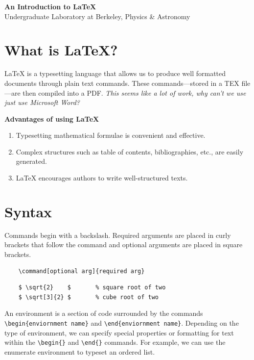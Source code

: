 \documentclass[11pt]{article}
\begin{document}
\begin{center}
    \huge \textbf{An Introduction to \LaTeX}\\{\LARGE Undergraduate Laboratory at Berkeley, Physics \& Astronomy}
\end{center}

\section{What is LaTeX?}

LaTeX is a typesetting language that allows us to produce well formatted documents through plain text commands. These commands---stored in a TEX file---are then compiled into a PDF. \textit{This seems like a lot of work, why can't we use just use Microsoft Word?}

\textbf{Advantages of using LaTeX}
\begin{enumerate}
    \item Typesetting mathematical formulae is convenient and effective.
    \item Complex structures such as table of contents, bibliographies, etc., are easily generated.
    \item LaTeX encourages authors to write well-structured texts.
\end{enumerate}

\section{Syntax}

Commands begin with a backslash. Required arguments are placed in curly brackets that follow the command and optional arguments are placed in square brackets.

{\color{blue}
\begin{verbatim}
    \command[optional arg]{required arg}
\end{verbatim}}
{\color{blue}
\begin{verbatim}
    $ \sqrt{2}    $       % square root of two
    $ \sqrt[3]{2} $       % cube root of two
\end{verbatim}}
An environment is a section of code surrounded by the commands {\color{blue}\verb|\begin{enviornment name}|} and {\color{blue}\verb|\end{enviornment name}|}. Depending on the type of environment, we can specify special properties or formatting for text within the {\color{blue}\verb|\begin{}|} and {\color{blue}\verb|\end{}|} commands. For example, we can use the enumerate environment to typeset an ordered list. 
\end{document}
